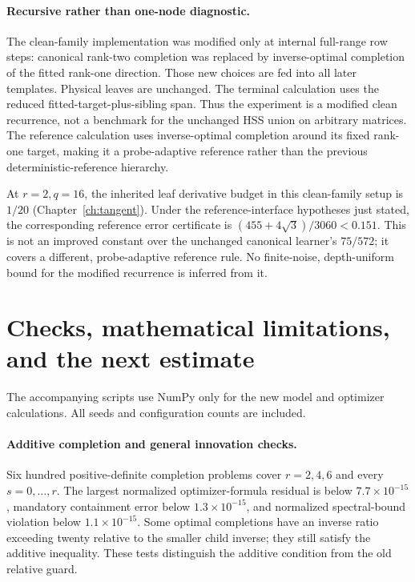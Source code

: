 \documentclass[11pt,oneside,openany,a4paper]{book}
\numberwithin{equation}{chapter}
\theoremstyle{definition}
\theoremstyle{remark}
\begin{document}
\paragraph{Recursive rather than one-node diagnostic.}
The clean-family implementation was modified only at internal full-range row steps: canonical rank-two completion was replaced by inverse-optimal completion of the fitted rank-one direction. Those new choices are fed into all later templates. Physical leaves are unchanged. The terminal calculation uses the reduced fitted-target-plus-sibling span. Thus the experiment is a modified clean recurrence, not a benchmark for the unchanged HSS union on arbitrary matrices. The reference calculation uses inverse-optimal completion around its fixed rank-one target, making it a probe-adaptive reference rather than the previous deterministic-reference hierarchy.

At $r=2,q=16$, the inherited leaf derivative budget in this clean-family setup is $1/20$ (Chapter~\ref{ch:tangent}). Under the reference-interface hypotheses just stated, the corresponding reference error certificate is $(455+4\sqrt3)/3060<0.151$. This is not an improved constant over the unchanged canonical learner's $75/572$; it covers a different, probe-adaptive reference rule. No finite-noise, depth-uniform bound for the modified recurrence is inferred from it.

\section{Checks, mathematical limitations, and the next estimate}\label{core:sec:checks}
The accompanying scripts use NumPy only for the new model and optimizer calculations. All seeds and configuration counts are included.

\paragraph{Additive completion and general innovation checks.}
Six hundred positive-definite completion problems cover $r=2,4,6$ and every $s=0,\ldots,r$. The largest normalized optimizer-formula residual is below $7.7\times10^{-15}$, mandatory containment error below $1.3\times10^{-15}$, and normalized spectral-bound violation below $1.1\times10^{-15}$. Some optimal completions have an inverse ratio exceeding twenty relative to the smaller child inverse; they still satisfy the additive inequality. These tests distinguish the additive condition from the old relative guard.
\end{document}
